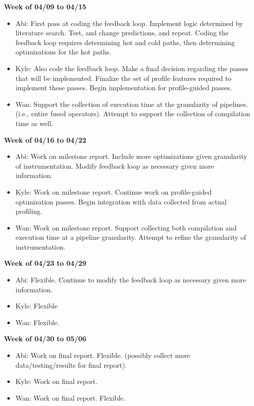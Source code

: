 \documentclass{vldb}
\begin{document}
\textbf{Week of 04/09 to 04/15}
\begin{itemize}
    \item Abi: First pass at coding the feedback loop. Implement logic determined by literature search. Test, and change predictions, and repeat. 
    Coding the feedback loop requires determining hot and cold paths, then determining optimizations for the hot paths. 
    \item Kyle: Also code the feedback loop. Make a final decision regarding the passes that will be implemented. Finalize the set of profile features required to implement these passes. Begin implementation for profile-guided passes.
    \item Wan: Support the collection of execution time at the granularity of pipelines. (i.e., entire fused operators). Attempt to support the collection of compilation time as well.
\end{itemize}

\textbf{Week of 04/16 to 04/22}
\begin{itemize}
    \item Abi: Work on milestone report. Include more optimizations given granularity of instrumentation. Modify feedback loop as necessary given more information.
    \item Kyle: Work on milestone report. Continue work on profile-guided optimization passes. Begin integration with data collected from actual profiling.
    \item Wan: Work on milestone report. Support collecting both compilation and execution time at a pipeline granularity. Attempt to refine the granularity of instrumentation.
\end{itemize}

\textbf{Week of 04/23 to 04/29}
\begin{itemize}
    \item Abi: Flexible. Continue to modify the feedback loop as necessary given more information.  
    \item Kyle: Flexible
    \item Wan: Flexible.
\end{itemize}

\textbf{Week of 04/30 to 05/06}
\begin{itemize}
    \item Abi: Work on final report. Flexible. (possibly collect more data/testing/results for final report).
    \item Kyle: Work on final report.
    \item Wan: Work on final report. Flexible.
\end{itemize}
\end{document}
